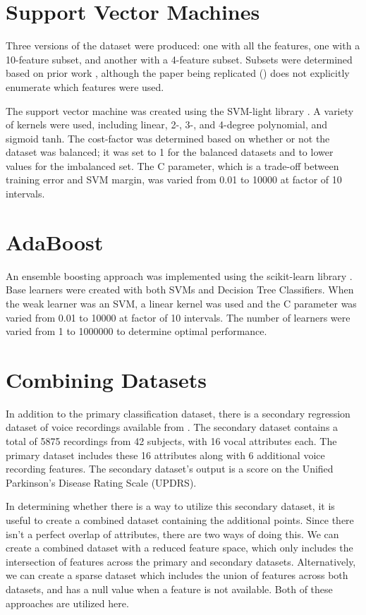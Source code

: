 \documentclass[draftcopy]{srpaper}
\begin{document}
\section{Support Vector Machines}
Three versions of the dataset were produced: one with all the
features, one with a 10-feature subset, and another with a 4-feature
subset. Subsets were determined based on prior work
\cite{LittleMHSR09}, although the paper being replicated (\cite{MS12})
does not explicitly enumerate which features were used.

The support vector machine was created using the SVM-light library \cite{svmlight}. A
variety of kernels were used, including linear, 2-, 3-, and 4-degree
polynomial, and sigmoid tanh. The cost-factor was determined based on whether
or not the dataset was balanced; it was set to 1 for the
balanced datasets and to lower values for the imbalanced set. The C
parameter, which is a trade-off between training error and SVM margin,
was varied from 0.01 to 10000 at factor of 10 intervals.


\section{AdaBoost}
An ensemble boosting approach was implemented using the scikit-learn
library \cite{scikitlearn}. Base learners were created with both SVMs and Decision Tree
Classifiers. When the weak learner was an SVM, a linear kernel was
used and the C parameter was varied from 0.01 to 10000 at factor of 10
intervals. The number of learners were varied from 1 to 1000000 to
determine optimal performance.

\section{Combining Datasets}
In addition to the primary classification dataset, there is a
secondary regression dataset of voice recordings available from \cite{Bache+Lichman:2013}. The
secondary dataset contains a total of 5875 recordings from 42
subjects, with 16 vocal attributes each. The primary dataset includes
these 16 attributes along with 6 additional voice recording features. The
secondary dataset's output is a score on the
Unified Parkinson's Disease Rating Scale (UPDRS).

In determining whether there is a way to utilize this secondary
dataset, it is useful to create a combined dataset containing the
additional points. Since there isn't a perfect overlap of attributes,
there are two ways of doing this. We can create a combined
dataset with a reduced feature space, which only includes the
intersection of features across the
primary and secondary datasets. Alternatively, we can create a sparse
dataset which includes the union of features across both datasets, and
has a null value when a feature is not available. Both of these
approaches are utilized here.
\end{document}
